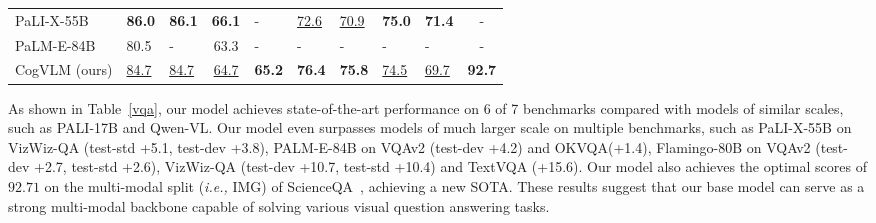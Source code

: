 \begin{table*}[htbp]
{{\begin{tabular}{lp{0.8cm}p{0.8cm}cp{1.2cm}p{0.8cm}p{0.8cm}>{\centering}p{1.2cm}>{\centering}p{1.2cm}c}
        PaLI-X-55B~\citep{chen2023pali} & \textbf{86.0} & \textbf{86.1} & \textbf{66.1} & - & \underline{72.6} & \underline{70.9} & \textbf{75.0}  & \textbf{71.4} & -\\
        PaLM-E-84B~\citep{driess2023palm} & 80.5 & - & 63.3 & - & - & - & - & - & -\\
\hline
        CogVLM (ours) & \underline{84.7} & \underline{84.7} & \underline{64.7} & \textbf{65.2} & \textbf{76.4} & \textbf{75.8} & \underline{74.5}  & \underline{69.7} & \textbf{92.7}\\
\bottomrule
    \end{tabular}
  }
 }
\label{vqa}
\end{table*}



 As shown in Table~\ref{vqa}, our model achieves state-of-the-art performance on 6 of 7 benchmarks compared with models of similar scales, such as PALI-17B and Qwen-VL. Our model even surpasses models of much larger scale on multiple benchmarks, such as PaLI-X-55B on VizWiz-QA (test-std +5.1, test-dev +3.8), PALM-E-84B on VQAv2 (test-dev +4.2) and OKVQA(+1.4), Flamingo-80B on VQAv2 (test-dev +2.7, test-std +2.6), VizWiz-QA (test-dev +10.7, test-std +10.4) and TextVQA (+15.6).
Our model also achieves the optimal scores of $92.71$ on the multi-modal split (\emph{i.e.,} IMG) of ScienceQA~\citep{lu2022learn}, achieving a new SOTA.
These results suggest that our base model can serve as a strong multi-modal backbone capable of solving various visual question answering tasks.

